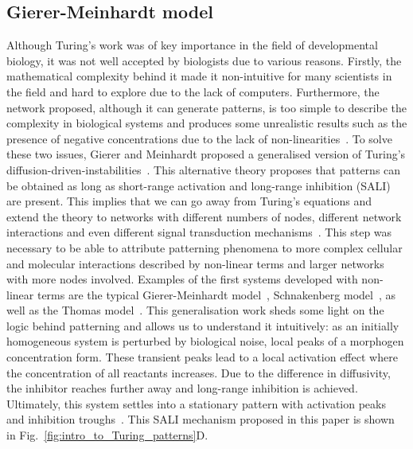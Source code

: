 \subsection{Gierer-Meinhardt model}
Although Turing’s work was of key importance in the field of developmental biology, it was not well accepted by biologists due to various reasons.
Firstly, the mathematical complexity behind it made it non-intuitive for many scientists in the field and hard to explore due to the lack of computers.
Furthermore, the network proposed, although it can generate patterns, is too simple to describe the complexity in biological systems and produces some unrealistic results such as the presence of negative concentrations due to the lack of non-linearities~\parencite{Kondo2010a}.
To solve these two issues, Gierer and Meinhardt proposed a generalised version of Turing’s diffusion-driven-instabilities~\parencite{Gierer1972}.
This alternative theory proposes that patterns can be obtained as long as short-range activation and long-range inhibition (SALI) are present.
This implies that we can go away from Turing’s equations and extend the theory to networks with different numbers of nodes, different network interactions and even different signal transduction mechanisms~\parencite{Murray1983, Rauch2004, Swindale1980}.
This step was necessary to be able to attribute patterning phenomena to more complex cellular and molecular interactions described by non-linear terms and larger networks with more nodes involved.
Examples of the first systems developed with non-linear terms are the typical Gierer-Meinhardt model~\parencite{Gierer1972}, Schnakenberg model~\parencite{Schnakenberg1979}, as well as the Thomas model~\parencite{thomas1976analysis}.
This generalisation work sheds some light on the logic behind patterning and allows us to understand it intuitively: as an initially homogeneous system is perturbed by biological noise, local peaks of a morphogen concentration form.
These transient peaks lead to a local activation effect where the concentration of all reactants increases.
Due to the difference in diffusivity, the inhibitor reaches further away and long-range inhibition is achieved.
Ultimately, this system settles into a stationary pattern with activation peaks and inhibition troughs~\parencite{Gierer1972}.
This SALI mechanism proposed in this paper is shown in Fig.~\ref{fig:intro_to_Turing_patterns}D.



